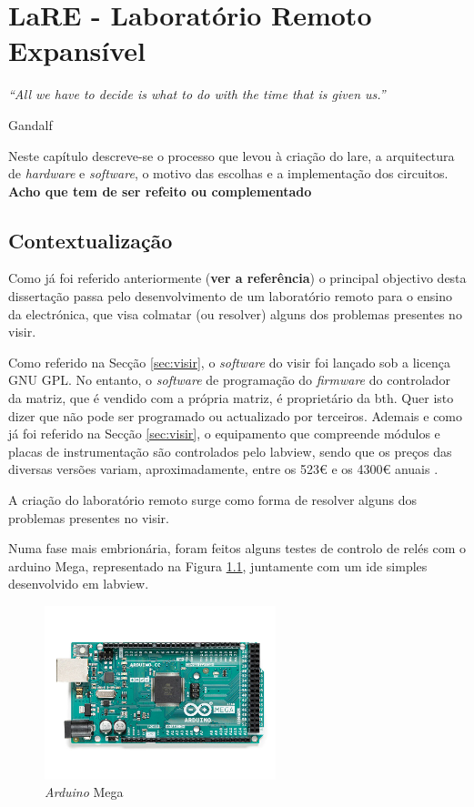 \chapter{LaRE - Laboratório Remoto Expansível}
\label{Capítulo3}
\begin{center}
    \textit{``All we have to decide is what to do with the time that is given us.''}

    Gandalf
\end{center}

Neste capítulo descreve-se o processo que levou à criação do \acrshort{lare}, a arquitectura de \textit{hardware} e \textit{software}, o motivo das escolhas e a implementação dos circuitos. \textbf{Acho que tem de ser refeito ou complementado}

\section{Contextualização}
\label{sec:contextualização}
Como já foi referido anteriormente (\textbf{ver a referência}) o principal objectivo desta dissertação passa pelo desenvolvimento de um \acrshort{laboratório remoto} para o ensino da electrónica, que visa colmatar (ou resolver) alguns dos problemas presentes no \acrshort{visir}.

Como referido na Secção \ref{sec:visir}, o \textit{software} do \acrshort{visir} foi lançado sob a licença GNU GPL. No entanto, o \textit{software} de programação do \textit{firmware} do controlador da matriz, que é vendido com a própria matriz, é proprietário da \acrshort{bth}. Quer isto dizer que não pode ser programado ou actualizado por terceiros. Ademais e como já foi referido na Secção \ref{sec:visir}, o equipamento que compreende módulos e placas de instrumentação são controlados pelo \acrshort{labview}, sendo que os preços das diversas versões variam, aproximadamente, entre os 523€ e os 4300€ anuais \cite{labviewpricing}.

A criação do \acrshort{laboratório remoto} surge como forma de resolver alguns dos problemas presentes no \acrshort{visir}.

Numa fase mais embrionária, foram feitos alguns testes de controlo de relés com o \gls{arduino} Mega, representado na Figura \ref{fig:arduinomega}, juntamente com um \acrfull{ide} simples desenvolvido em \acrshort{labview}.

\begin{figure}[hbtp]
    \centering
    \includegraphics[width=0.6\textwidth]{figures/arduinomega.png}
    \caption{\textit{Arduino} Mega \cite{ArduinoMega}}
    \label{fig:arduinomega}
\end{figure}

